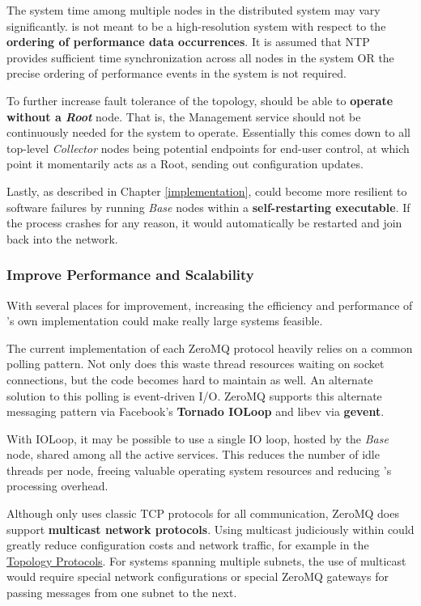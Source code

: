 The system time among multiple nodes in the distributed system may vary significantly. \dcamp is not meant to be a
high-resolution system with respect to the \textbf{ordering of performance data occurrences}. It is assumed that NTP
provides sufficient time synchronization across all nodes in the system OR the precise ordering of performance events in
the system is not required.

To further increase fault tolerance of the topology, \dcamp should be able to \textbf{operate without a \textit{Root}}
node. That is, the Management service should not be continuously needed for the system to operate. Essentially this
comes down to all top-level \textit{Collector} nodes being potential endpoints for end-user control, at which point it
momentarily acts as a Root, sending out configuration updates.

Lastly, as described in Chapter \ref{implementation}, \dcamp could become more resilient to software failures by running
\textit{Base} nodes within a \textbf{self-restarting executable}. If the process crashes for any reason, it would
automatically be restarted and join back into the network.

\subsubsection{Improve Performance and Scalability}

With several places for improvement, increasing the efficiency and performance of \dcampns's own implementation could
make really large systems feasible.

The current implementation of each ZeroMQ protocol heavily relies on a common polling pattern. Not only does this waste
thread resources waiting on socket connections, but the code becomes hard to maintain as well. An alternate solution to
this polling is event-driven I/O. ZeroMQ supports this alternate messaging pattern via Facebook's \textbf{Tornado
IOLoop}\cite{tornado}\cite{ioloop} and libev via \textbf{gevent}\cite{gevent}\cite{libev}.

With IOLoop, it may be possible to use a single IO loop, hosted by the \textit{Base} node, shared among all the active
services. This reduces the number of idle threads per node, freeing valuable operating system resources and reducing
\dcampns's processing overhead.

Although \dcamp only uses classic TCP protocols for all communication, ZeroMQ does support \textbf{multicast network
protocols}. Using multicast judiciously within \dcamp could greatly reduce configuration costs and network traffic, for
example in the \hyperref[proto_topo]{Topology Protocols}. For \dcamp systems spanning multiple subnets, the use of
multicast would require special network configurations or special ZeroMQ gateways for passing messages from one subnet
to the next.

